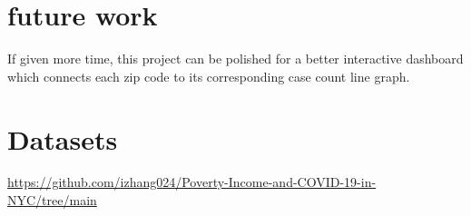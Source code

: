 \documentclass{vgtc}                 %
\begin{document}
\section{future work}{
If given more time, this project can be polished for a better interactive dashboard which connects each zip code to its corresponding case count line graph. 
}

\section{Datasets}
\noindent\url{https://github.com/izhang024/Poverty-Income-and-COVID-19-in-NYC/tree/main}

\end{document}

